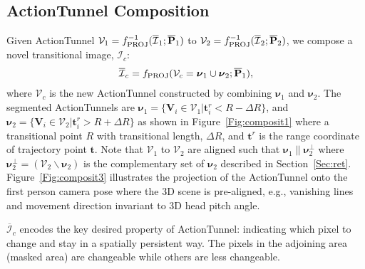 \documentclass[10pt,twocolumn,letterpaper]{article}
\begin{document}
\subsection{ActionTunnel Composition} \label{Sec:composition}

Given ActionTunnel $\mathcal{V}_1=f_{\rm  PROJ}^{-1}(\overline{\mathcal{I}}_1;\overline{\mathbf{P}}_1)$ to $\mathcal{V}_2=f_{\rm  PROJ}^{-1}(\overline{\mathcal{I}}_2;\overline{\mathbf{P}}_2)$, we compose a novel transitional image, $\mathcal{I}_c$:
\begin{align}
    \overline{\mathcal{I}}_c=f_{\rm PROJ}(\mathcal{V}_c= \boldsymbol{\nu}_1 \cup \boldsymbol{\nu}_2;\overline{\mathbf{P}}_1), \label{Eq:proj}
\end{align}
where $\mathcal{V}_c$ is the new ActionTunnel constructed by combining $\boldsymbol{\nu}_1$ and $\boldsymbol{\nu}_2$. The segmented ActionTunnels are $\boldsymbol{\nu}_1 = \{\mathbf{V}_i \in \mathcal{V}_1|\mathbf{t}_i^r<R-\Delta R\}$, and $\boldsymbol{\nu}_2 = \{\mathbf{V}_i \in \mathcal{V}_2|\mathbf{t}_i^r>R+\Delta R\}$ as shown in Figure~\ref{Fig:composit1} where a transitional point $R$ with transitional length, $\Delta R$, and $\mathbf{t}^r$ is the range coordinate of trajectory point $\mathbf{t}$.
Note that $\mathcal{V}_1$ to $\mathcal{V}_2$ are aligned such that $\boldsymbol{\nu}_1 \parallel \boldsymbol{\nu}_2^\bot$ where $\boldsymbol{\nu}_2^\bot=\left(\mathcal{V}_2 \backslash \boldsymbol{\nu}_2\right)$ is the complementary set of $\boldsymbol{\nu}_2$ described in Section~\ref{Sec:ret}. Figure~\ref{Fig:composit3} illustrates the projection of the ActionTunnel onto the first person camera pose where the 3D scene is pre-aligned, e.g., vanishing lines and movement direction invariant to 3D head pitch angle. 


$\overline{\mathcal{I}}_c$ encodes the key desired property of ActionTunnel: indicating which pixel to change and stay in a spatially persistent way. The pixels in the adjoining area (masked area) are changeable while others are less changeable. 

\end{document}
